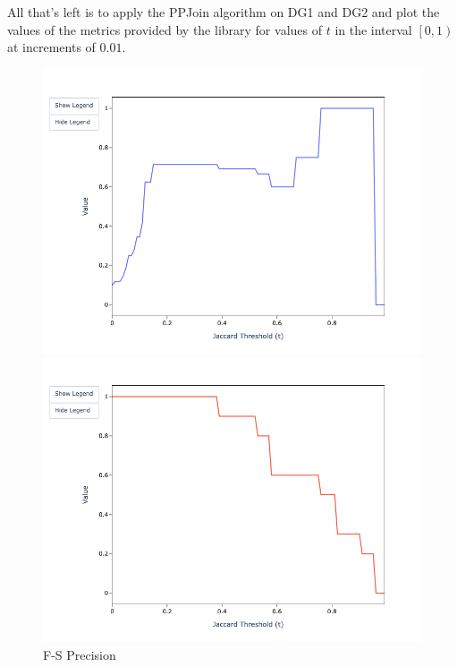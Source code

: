 \documentclass[11pt]{article}
\begin{document}
    All that's left is to apply the PPJoin algorithm on DG1 and DG2 and plot the
    values of the metrics provided by the library for values of $t$ in the
    interval $\left[0, 1\right)$ at increments of $0.01$.

    \begin{figure}[h!]
        \begin{minipage}{0.32\textwidth}
            \centering
            \includegraphics[width=\textwidth]{sample-usage/mini-fs-precision}
            \caption{F-S Precision}
        \end{minipage}    
        \begin{minipage}{0.32\textwidth}
            \centering
            \includegraphics[width=\textwidth]{sample-usage/mini-fs-recall}

\end{minipage}
\end{figure}
\end{document}
